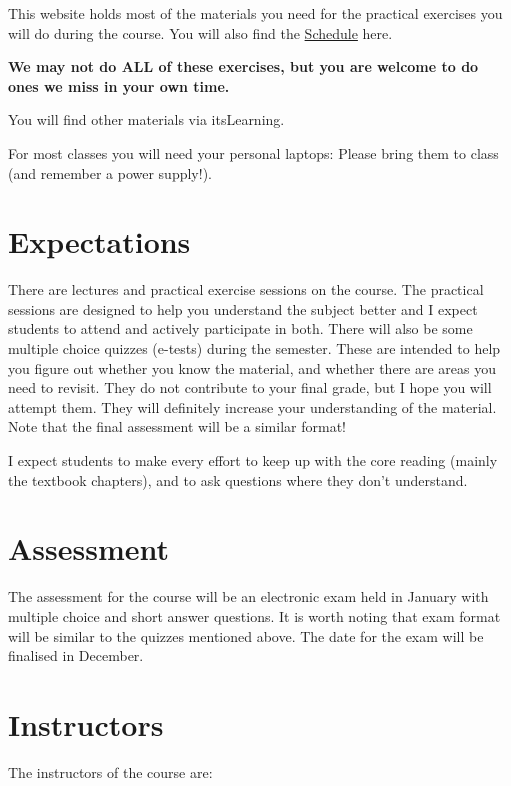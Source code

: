 \documentclass[
  a4paper]{book}
\begin{document}
This website holds most of the materials you need for the practical exercises you will do during the course. You will also find the \href{https://jonesor.github.io/BB512_Book/schedule.html}{Schedule} here.

\textbf{We may not do ALL of these exercises, but you are welcome to do ones we miss in your own time.}

You will find other materials via itsLearning.

For most classes you will need your personal laptops: Please bring them to class (and remember a power supply!).

\hypertarget{expectations}{%
\section{Expectations}\label{expectations}}

There are lectures and practical exercise sessions on the course. The practical sessions are designed to help you understand the subject better and I expect students to attend and actively participate in both. There will also be some multiple choice quizzes (e-tests) during the semester. These are intended to help you figure out whether you know the material, and whether there are areas you need to revisit. They do not contribute to your final grade, but I hope you will attempt them. They will definitely increase your understanding of the material. Note that the final assessment will be a similar format!

I expect students to make every effort to keep up with the core reading (mainly the textbook chapters), and to ask questions where they don't understand.

\hypertarget{assessment}{%
\section{Assessment}\label{assessment}}

The assessment for the course will be an electronic exam held in January with multiple choice and short answer questions. It is worth noting that exam format will be similar to the quizzes mentioned above. The date for the exam will be finalised in December.

\hypertarget{instructors}{%
\section{Instructors}\label{instructors}}

The instructors of the course are:
\end{document}
